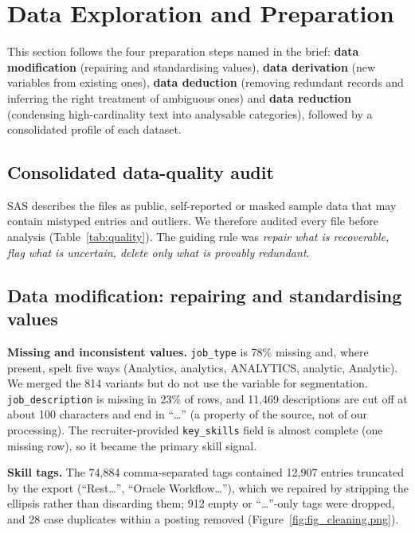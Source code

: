 \section{Data Exploration and Preparation}\label{sec:data}

This section follows the four preparation steps named in the brief: \textbf{data modification}
(repairing and standardising values), \textbf{data derivation} (new variables from existing ones),
\textbf{data deduction} (removing redundant records and inferring the right treatment of ambiguous
ones) and \textbf{data reduction} (condensing high-cardinality text into analysable categories),
followed by a consolidated profile of each dataset.

\subsection{Consolidated data-quality audit}

SAS describes the files as public, self-reported or masked sample data that may contain mistyped
entries and outliers. We therefore audited every file before analysis (Table~\ref{tab:quality}).
The guiding rule was \emph{repair what is recoverable, flag what is uncertain, delete only what is
provably redundant}.

\begin{table}[H]\centering\scriptsize
\caption{Data-quality audit and actions for the four SAS files.}\label{tab:quality}

\end{table}

\subsection{Data modification: repairing and standardising values}

\textbf{Missing and inconsistent values.} \texttt{job\_type} is 78\% missing and, where present,
spelt five ways (Analytics, analytics, ANALYTICS, analytic, Analytic). We merged the 814 variants
but do not use the variable for segmentation. \texttt{job\_description} is missing in 23\% of rows,
and 11,469 descriptions are cut off at about 100 characters and end in ``\ldots'' (a property of the
source, not of our processing). The recruiter-provided \texttt{key\_skills} field is almost complete
(one missing row), so it became the primary skill signal.

\textbf{Skill tags.} The 74,884 comma-separated tags contained 12,907 entries truncated by the
export (``Rest\ldots'', ``Oracle Workflow\ldots''), which we repaired by stripping the ellipsis rather
than discarding them; 912 empty or ``\ldots''-only tags were dropped, and 28 case duplicates within a
posting removed (Figure~\ref{fig:fig_cleaning.png}).

